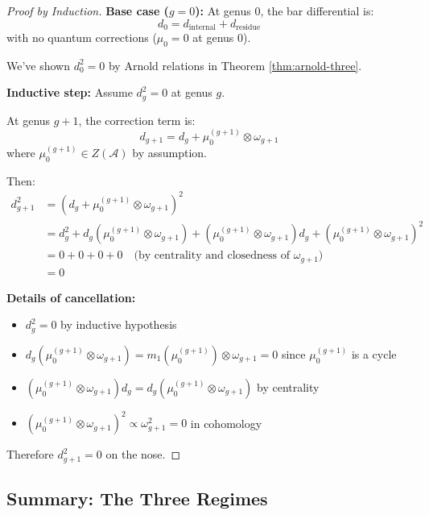 \begin{proof}[Proof by Induction]

\textbf{Base case ($g = 0$):} 
At genus 0, the bar differential is:
$$d_0 = d_{\text{internal}} + d_{\text{residue}}$$
with no quantum corrections ($\mu_0 = 0$ at genus 0).

We've shown $d_0^2 = 0$ by Arnold relations in Theorem \ref{thm:arnold-three}.

\textbf{Inductive step:}
Assume $d_g^2 = 0$ at genus $g$. 

At genus $g+1$, the correction term is:
$$d_{g+1} = d_g + \mu_0^{(g+1)} \otimes \omega_{g+1}$$
where $\mu_0^{(g+1)} \in Z(\mathcal{A})$ by assumption.

Then:
\begin{align}
d_{g+1}^2 &= (d_g + \mu_0^{(g+1)} \otimes \omega_{g+1})^2 \\
&= d_g^2 + d_g(\mu_0^{(g+1)} \otimes \omega_{g+1}) + (\mu_0^{(g+1)} \otimes \omega_{g+1})d_g 
+ (\mu_0^{(g+1)} \otimes \omega_{g+1})^2 \\
&= 0 + 0 + 0 + 0 \quad \text{(by centrality and closedness of $\omega_{g+1}$)} \\
&= 0
\end{align}

\textbf{Details of cancellation:}
\begin{itemize}
\item $d_g^2 = 0$ by inductive hypothesis
\item $d_g(\mu_0^{(g+1)} \otimes \omega_{g+1}) = m_1(\mu_0^{(g+1)}) \otimes \omega_{g+1} = 0$ 
since $\mu_0^{(g+1)}$ is a cycle
\item $(\mu_0^{(g+1)} \otimes \omega_{g+1})d_g = d_g(\mu_0^{(g+1)} \otimes \omega_{g+1})$ by centrality
\item $(\mu_0^{(g+1)} \otimes \omega_{g+1})^2 \propto \omega_{g+1}^2 = 0$ in cohomology
\end{itemize}

Therefore $d_{g+1}^2 = 0$ on the nose.

\end{proof}

\subsection{Summary: The Three Regimes}

